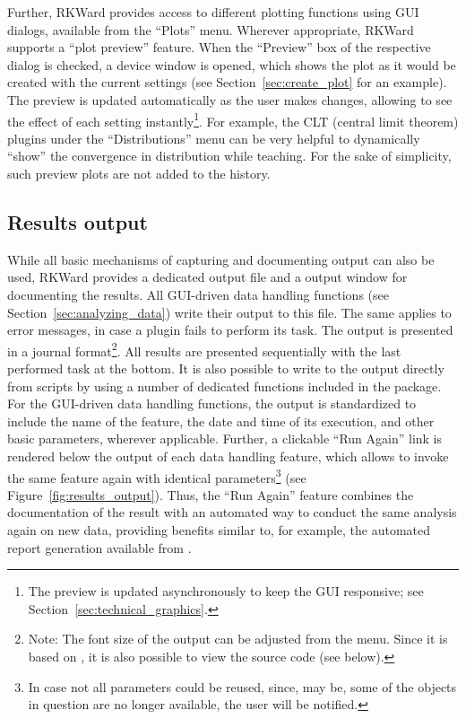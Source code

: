 Further, RKWard provides access to different plotting functions using GUI dialogs,
available from the ``Plots'' menu. Wherever appropriate, RKWard supports a ``plot
preview'' feature. When the ``Preview'' box of
the respective dialog is checked, a device window is opened, which
shows the plot as it would be created with the current settings (see Section~\ref{sec:create_plot} for an example). The
preview is updated automatically as the user makes changes, allowing to
see the effect of each setting instantly\footnote{The preview is
updated asynchronously to keep the GUI responsive; see Section~\ref{sec:technical_graphics}.}. For example, the CLT 
(central limit theorem) plugins
under the ``Distributions'' menu can be very helpful to dynamically ``show''
the convergence in distribution while teaching. For the sake of simplicity, such preview plots are not added to
the history.

\subsection{Results output}
\label{sec:results_output}

While all basic mechanisms of
capturing and documenting  output can also
be used, RKWard provides a dedicated output file and a output
window for documenting the results. All GUI-driven data handling
functions (see Section~\ref{sec:analyzing_data}) write their output to this file. 
The same applies to error messages, in case a plugin fails to perform its task.
The output is presented in a journal format\footnote{Note: The font size of the output can be adjusted
from the menu. 
Since it is based on , it is also possible to view the source code 
(see below).}. All results are presented
sequentially with the last performed task at the bottom.
It is also possible to write to the output directly from 
scripts by using a number of dedicated 
functions included in the  package. For the GUI-driven data handling functions, the output is
standardized to include the name of the feature, the date and time of
its execution, and other basic parameters, wherever
applicable. Further, a clickable ``Run
Again'' link is rendered below the output of each data
handling feature, which allows to invoke the same feature again with
identical parameters\footnote{In case not all parameters could be
reused, since, may be, some of the objects in
question are no longer available, the user will be notified.} (see
Figure~\ref{fig:results_output}). Thus, the ``Run
Again'' feature combines the documentation of the result
with an automated way to conduct the same analysis again on new
data, providing benefits similar to, for example, the automated report generation
available from  \citep{RaffelsbergerW2008}.

